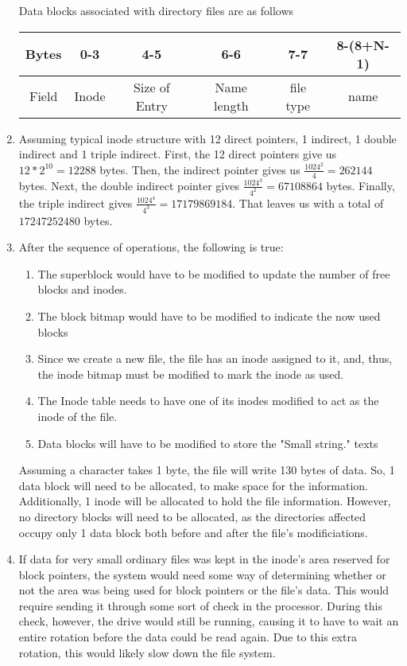\documentclass[12pt,letterpaper]{report}
\begin{document}
\begin{enumerate}
Data blocks associated with directory files are as follows\\
\begin{tabular}{|c|c|c|c|c|c|}
\hline
Bytes & 0-3 & 4-5 & 6-6 & 7-7 & 8-(8+N-1) \\
\hline
Field & Inode & Size of Entry & Name length & file type & name\\
\hline
\end{tabular}
\item Assuming typical inode structure with 12 direct pointers, 1 indirect, 1 double indirect and 1 triple indirect. First, the 12 direct pointers give us $12 * 2^{10} = 12288$ bytes. Then, the indirect pointer gives us $\frac{1024^2}{4} = 262144$ bytes. Next, the double indirect pointer gives $\frac{1024^3}{4^2} = 67108864$ bytes. Finally, the triple indirect gives $\frac{1024^4}{4^3} = 17179869184$. That leaves us with a total of $17247252480$ bytes.

\item After the sequence of operations, the following is true:
\begin{enumerate}
\item The superblock would have to be modified to update the number of free blocks and
inodes.
\item The block bitmap would have to be modified to indicate the now used blocks
\item Since we create a new file, the file has an inode assigned to it, and, thus,
the inode bitmap must be modified to mark the inode as used.
\item The Inode table needs to have one of its inodes modified to act as the inode of the
file. 
\item Data blocks will have to be modified to store the "Small string." texts
\end{enumerate}
Assuming a character takes 1 byte, the file will write 130 bytes of data. So, 1 data block
will need to be allocated, to make space for the information. Additionally, 1 inode will be
allocated to hold the file information. However, no directory blocks will need to be
allocated, as the directories affected occupy only 1 data block both before and after the
file's modificiations. 
\item If data for very small ordinary files was kept in the inode's area reserved for block
pointers, the system would need some way of determining whether or not the area was being
used for block pointers or the file's data. This would require sending it through some sort
of check in the processor. During this check, however, the drive would still be running,
causing it to have to wait an entire rotation before the data could be read again.
Due to this extra rotation, this would likely slow down the file system. 


\end{enumerate}
\end{document}
